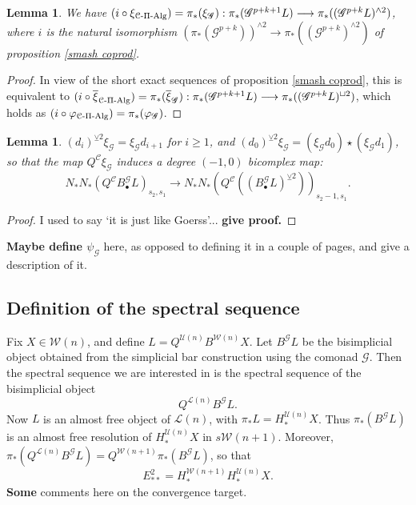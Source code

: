 \documentclass[11pt]{amsart}
\theoremstyle{plain}
\newtheorem{lem}[thm]{Lemma}
\theoremstyle{definition}
\let\phi\varphi
\renewcommand{\to}{\longrightarrow}
\newcommand{\scrG}{\mathscr{G}}
\newcommand{\calU}{\mathcal{U}}
\newcommand{\calL}{\mathcal{L}}
\newcommand{\calw}{\mathcal{W}}
\newcommand{\calc}{\mathcal{C}}
\theoremstyle{plain}
\newcommand{\BSW}{{\scrG}}
\newcommand{\BSWres}{B^\BSW}%
\newcommand{\PiAlg}{\textup{-$\Pi$-Alg}}
\newcommand{\smashcoprod}{\veebar}%
\begin{document}
\begin{Composite functor spectral sequences}
\begin{lem}\label{LemmaOn xi}
We have $(i\circ \xi_{\calc\PiAlg})=\pi_*(\xi_{\BSW}):\pi_*(\BSW^{p+k+1}L)\to\pi_*((\BSW^{p+k}L)^{\wedge 2})$, where $i$ is the natural isomorphism $(\pi_*(\BSW^{p+k}))^{\wedge 2}\to \pi_*((\BSW^{p+k})^{\wedge 2})$ of proposition \ref{smash coprod}.
\end{lem}
\begin{proof}
In view of the short exact sequences of proposition \ref{smash coprod}, this is equivalent to $(i\circ \overline{\xi}_{\calc\PiAlg})=\pi_*(\overline{\xi}_{\BSW}):\pi_*(\BSW^{p+k+1}L)\to\pi_*((\BSW^{p+k}L)^{\sqcup 2})$, which holds as $(i\circ\phi_{\calc\PiAlg})=\pi_*(\phi_{\BSW})$.
\end{proof}
\begin{lem}
$(d_i)^{\smashcoprod 2}\xi_\BSW =\xi_\BSW d_{i+1}$ for $i\geq1$, and $(d_0)^{\smashcoprod 2}\xi_\BSW = (\xi_\BSW d_{0})\star(\xi_\BSW d_{1})$, so that the map $Q^{\calc}\xi_\BSW $ induces a degree $(-1,0)$ bicomplex map:
\[N_*N_*(Q^{\calc}B^\BSW_{\bullet}L)_{s_2,s_1}\to
  N_*N_*(Q^{\calc}((B^\BSW_{\bullet}L)^{\smashcoprod 2}))_{s_2-1,s_1}.\]
\end{lem}
\begin{proof}
I used to say `it is just like Goerss'... \textbf{give proof.}
\end{proof}
\textbf{Maybe define $\psi_\BSW$} here, as opposed to defining it in a couple of pages, and give a description of it.

\subsection{Definition of the spectral sequence}
Fix $X\in\calw(n)$, and define $L=Q^{\calU(n)}B^{\calw(n)}X$. Let $\BSWres L$ be the bisimplicial object obtained from the simplicial bar construction using the comonad $\BSW$. Then the spectral sequence we are interested in is the spectral sequence of the bisimplicial object
\[Q^{\calL(n)}\BSWres L.\]
Now $L$ is an almost free object of $\calL(n)$, with $\pi_*L=H_*^{\calU(n)}X$. Thus $\pi_*(\BSWres L)$ is an almost free resolution of $H_*^{\calU(n)}X$ in $s\calw(n+1)$. Moreover, $\pi_*(Q^{\calL(n)}\BSWres L)=Q^{\calw(n+1)}\pi_*(\BSWres L)$, so that
\[E^2_{**}=H_*^{\calw(n+1)}H_*^{\calU(n)}X.\]
\textbf{Some} comments here on the convergence target.


\end{Composite functor spectral sequences}
\end{document}
